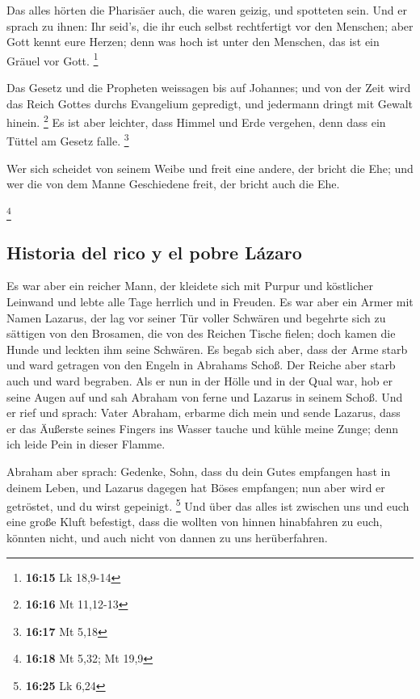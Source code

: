  Das alles hörten die Pharisäer auch, die waren geizig,
und spotteten sein.  Und er sprach zu ihnen: Ihr seid's,
die ihr euch selbst rechtfertigt vor den Menschen; aber Gott kennt eure
Herzen; denn was hoch ist unter den Menschen, das ist ein Gräuel vor
Gott. \footnote{\textbf{16:15} Lk 18,9-14}

 Das Gesetz und die Propheten weissagen bis auf Johannes;
und von der Zeit wird das Reich Gottes durchs Evangelium gepredigt, und
jedermann dringt mit Gewalt hinein. \footnote{\textbf{16:16} Mt 11,12-13}
 Es ist aber leichter, dass Himmel und Erde vergehen,
denn dass ein Tüttel am Gesetz falle. \footnote{\textbf{16:17} Mt 5,18}

 Wer sich scheidet von seinem Weibe und freit eine
andere, der bricht die Ehe; und wer die von dem Manne Geschiedene freit,
der bricht auch die Ehe.

\footnote{\textbf{16:18} Mt 5,32; Mt 19,9}

\hypertarget{historia-del-rico-y-el-pobre-luxe1zaro}{%
\subsection{Historia del rico y el pobre
Lázaro}\label{historia-del-rico-y-el-pobre-luxe1zaro}}

 Es war aber ein reicher Mann, der kleidete sich mit
Purpur und köstlicher Leinwand und lebte alle Tage herrlich und in
Freuden.  Es war aber ein Armer mit Namen Lazarus, der
lag vor seiner Tür voller Schwären  und begehrte sich zu
sättigen von den Brosamen, die von des Reichen Tische fielen; doch kamen
die Hunde und leckten ihm seine Schwären.  Es begab sich
aber, dass der Arme starb und ward getragen von den Engeln in Abrahams
Schoß. Der Reiche aber starb auch und ward begraben.  Als
er nun in der Hölle und in der Qual war, hob er seine Augen auf und sah
Abraham von ferne und Lazarus in seinem Schoß.  Und er
rief und sprach: Vater Abraham, erbarme dich mein und sende Lazarus,
dass er das Äußerste seines Fingers ins Wasser tauche und kühle meine
Zunge; denn ich leide Pein in dieser Flamme.

 Abraham aber sprach: Gedenke, Sohn, dass du dein Gutes
empfangen hast in deinem Leben, und Lazarus dagegen hat Böses empfangen;
nun aber wird er getröstet, und du wirst gepeinigt. \footnote{\textbf{16:25}
  Lk 6,24}  Und über das alles ist zwischen uns und euch
eine große Kluft befestigt, dass die wollten von hinnen hinabfahren zu
euch, könnten nicht, und auch nicht von dannen zu uns herüberfahren.

